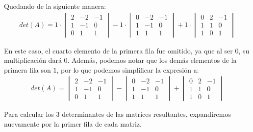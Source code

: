 \documentclass{article}
\begin{document}
Quedando de la siguiente manera:
\begin{align}
    det(A) = 1 \cdot \begin{vmatrix}
    2 & -2 & -1 \\
    1 & -1 & 0 \\
    0 & 1 & 1
    \end{vmatrix} - 1 \cdot \begin{vmatrix}
    0 & -2 & -1 \\
    1 & -1 & 0 \\
    1 & 1 & 1
    \end{vmatrix} + 1 \cdot \begin{vmatrix}
    0 & 2 & -1 \\
    1 & 1 & 0 \\
    1 & 0 & 1
    \end{vmatrix}
\end{align}

En este caso, el cuarto elemento de la primera fila fue omitido, ya que al ser $0$, su multiplicación dará $0$. Además, podemos notar que los demás elementos de la primera fila son $1$, por lo que podemos simplificar la expresión a: \\

\begin{align}
    det(A) = \begin{vmatrix}
    2 & -2 & -1 \\
    1 & -1 & 0 \\
    0 & 1 & 1
    \end{vmatrix} - \begin{vmatrix}
    0 & -2 & -1 \\
    1 & -1 & 0 \\
    1 & 1 & 1
    \end{vmatrix} + \begin{vmatrix}
    0 & 2 & -1 \\
    1 & 1 & 0 \\
    1 & 0 & 1
    \end{vmatrix}
\end{align}

Para calcular los 3 determinantes de las matrices resultantes, expandiremos nuevamente por la primer fila de cada matriz.
\end{document}
